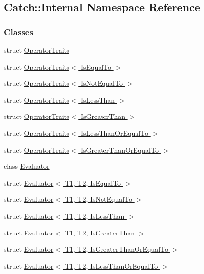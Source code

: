 \hypertarget{namespaceCatch_1_1Internal}{\subsection{Catch\-:\-:Internal Namespace Reference}
\label{namespaceCatch_1_1Internal}
}
\subsubsection*{Classes}
\begin{DoxyCompactItemize}
\item 
struct \hyperlink{structCatch_1_1Internal_1_1OperatorTraits}{Operator\-Traits}
\item 
struct \hyperlink{structCatch_1_1Internal_1_1OperatorTraits_3_01IsEqualTo_01_4}{Operator\-Traits$<$ Is\-Equal\-To $>$}
\item 
struct \hyperlink{structCatch_1_1Internal_1_1OperatorTraits_3_01IsNotEqualTo_01_4}{Operator\-Traits$<$ Is\-Not\-Equal\-To $>$}
\item 
struct \hyperlink{structCatch_1_1Internal_1_1OperatorTraits_3_01IsLessThan_01_4}{Operator\-Traits$<$ Is\-Less\-Than $>$}
\item 
struct \hyperlink{structCatch_1_1Internal_1_1OperatorTraits_3_01IsGreaterThan_01_4}{Operator\-Traits$<$ Is\-Greater\-Than $>$}
\item 
struct \hyperlink{structCatch_1_1Internal_1_1OperatorTraits_3_01IsLessThanOrEqualTo_01_4}{Operator\-Traits$<$ Is\-Less\-Than\-Or\-Equal\-To $>$}
\item 
struct \hyperlink{structCatch_1_1Internal_1_1OperatorTraits_3_01IsGreaterThanOrEqualTo_01_4}{Operator\-Traits$<$ Is\-Greater\-Than\-Or\-Equal\-To $>$}
\item 
class \hyperlink{classCatch_1_1Internal_1_1Evaluator}{Evaluator}
\item 
struct \hyperlink{structCatch_1_1Internal_1_1Evaluator_3_01T1_00_01T2_00_01IsEqualTo_01_4}{Evaluator$<$ T1, T2, Is\-Equal\-To $>$}
\item 
struct \hyperlink{structCatch_1_1Internal_1_1Evaluator_3_01T1_00_01T2_00_01IsNotEqualTo_01_4}{Evaluator$<$ T1, T2, Is\-Not\-Equal\-To $>$}
\item 
struct \hyperlink{structCatch_1_1Internal_1_1Evaluator_3_01T1_00_01T2_00_01IsLessThan_01_4}{Evaluator$<$ T1, T2, Is\-Less\-Than $>$}
\item 
struct \hyperlink{structCatch_1_1Internal_1_1Evaluator_3_01T1_00_01T2_00_01IsGreaterThan_01_4}{Evaluator$<$ T1, T2, Is\-Greater\-Than $>$}
\item 
struct \hyperlink{structCatch_1_1Internal_1_1Evaluator_3_01T1_00_01T2_00_01IsGreaterThanOrEqualTo_01_4}{Evaluator$<$ T1, T2, Is\-Greater\-Than\-Or\-Equal\-To $>$}
\item 
struct \hyperlink{structCatch_1_1Internal_1_1Evaluator_3_01T1_00_01T2_00_01IsLessThanOrEqualTo_01_4}{Evaluator$<$ T1, T2, Is\-Less\-Than\-Or\-Equal\-To $>$}
\end{DoxyCompactItemize}
